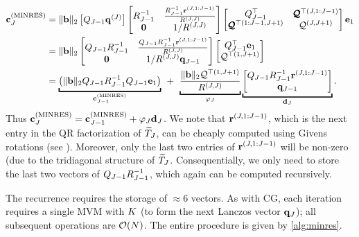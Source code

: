 \begin{align}
  \bc_J^{(\text{MINRES})} &=
  \Vert \bb \Vert_2 \begin{bmatrix}
    \bQ_{J-1} \bq^{(J)}
  \end{bmatrix} \begin{bmatrix}
    \bR_{J-1}^{-1} & \frac{ \bR_{J-1}^{-1} {\br^{(J,1:J-1)}} }{ R^{(J,J)} } \\
    \bzero & 1 / R^{(J,J)}
  \end{bmatrix} \begin{bmatrix}
    \bQU_{J-1}^\top & \bqu^{\top(J,1:J-1)} \\
    \bqu^{\top{(1:J-1,J+1)}} & \mathcal{Q}^{(J,J+1)}
  \end{bmatrix} \be_1
  \nonumber \\
  &=
  \Vert \bb \Vert_2
  \begin{bmatrix}
    \bQ_{J-1} \bR_{J-1}^{-1} & \frac{ \bQ_{J-1} \bR_{J-1}^{-1} {\br^{(J,1:J-1)}} }{ R^{(J,J)} } \\
    \bzero & 1 / R^{(J,J)} \bq_{J-1}
  \end{bmatrix} \begin{bmatrix}
    \bQU_{J-1}^\top \be_1
    \\
    \mathcal{Q}^{\top{(1,J+1)}}
  \end{bmatrix}
  \nonumber \\
  &=
  \underbracket{\left( \Vert \bb \Vert_2 \bQ_{J-1} \bR_{J-1}^{-1} \bQU_{J-1} \be_1 \right)}_{\bc_{J-1}^{(\text{MINRES})}}
  \:\: + \:\:
  \underbracket{\frac{\Vert \bb \Vert_2 \mathcal{Q}^{\top{(1,J+1)}}}{ R^{(J,J) }}}_{\varphi_J}
  \underbracket{\begin{bmatrix}
    \bQ_{J-1} \bR_{J-1}^{-1} {\br^{(J,1:J-1)}}  \\
    \bq_{J-1}
  \end{bmatrix}}_{\bd_J}.
  \label{eqn:minres_descent}
\end{align}
%
Thus $\mathbf{c}^{(\text{MINRES})}_J = \mathbf{c}^{(\text{MINRES})}_{J-1} + \varphi_J \mathbf{d}_J$.
We note that $\mathbf{r}^{(J,1:J-1)}$, which is the next entry in the QR factorization of $\widetilde {T}_J$, can be cheaply computed using Givens rotations (see \citep[e.g.][Ch. 11.4.1]{golub2012matrix}).
Moreover, only the last two entries of $\mathbf{r}^{(J,1:J-1)}$ will be non-zero (due to the tridiagonal structure of $\widetilde {T}_J$.
Consequentially, we only need to store the last two vectors of $Q_{J-1} R^{-1}_{J-1}$, which again can be computed recursively.

The recurrence requires the storage of $\approx 6$ vectors.
As with CG, each iteration requires a single MVM with $K$ (to form the next Lanczos vector $\mathbf{q}_J$); all subsequent operations are $\bigo{N}$.
The entire procedure is given by \cref{alg:minres}.


